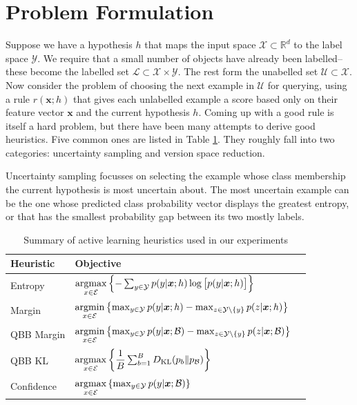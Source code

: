 \documentclass[fleqn,10pt,lineno]{wlpeerj} %
\newcommand{\B}{\mathcal{B}}
\newcommand{\X}{\mathcal{X}}
\newcommand{\Y}{\mathcal{Y}}
\newcommand{\Ecal}{\mathcal{E}}
\newcommand{\Unlabelled}{\mathcal{U}}
\newcommand{\Labelled}{\mathcal{L}}
\newcommand*{\argmin}{\operatornamewithlimits{argmin}\limits}
\newcommand*{\argmax}{\operatornamewithlimits{argmax}\limits}
\begin{document}
\section*{Problem Formulation}

Suppose we have a hypothesis $h$ that maps the input space $\X \subset \mathbb{R}^d$
to the label space $\Y$. We require that a small number of objects have already
been labelled--these become the labelled set $\Labelled \subset \X \times \Y$.
The rest form the unabelled set
$\Unlabelled \subset \X$. Now consider the problem of choosing the next example
in $\Unlabelled$ for querying, using a rule
$r(\bm{x}; h)$ that gives each unlabelled example a score based only on
their feature vector $\bm{x}$ and the current hypothesis $h$. Coming up with a good
rule is itself a hard problem, but there have been many attempts to derive
good heuristics. Five common ones are listed in Table \ref{tab:heuristics}.
They roughly fall into two categories: uncertainty sampling and version space
reduction.

Uncertainty sampling focusses on selecting the example whose class membership
the current hypothesis is most uncertain about. The most uncertain example can
be the one whose predicted class probability vector displays the greatest entropy, or
that has the smallest probability gap between its two mostly labels.


\begin{table}[h]
	\caption {Summary of active learning heuristics used in our experiments} \label{tab:heuristics}
	\centering
	\begin{tabular}{lll}
		\toprule
		{Heuristic}  &  Objective  \\
		\midrule
		Entropy &
			$\argmax_{x \in \Ecal} \left\{-\sum_{y \in \Y} p(y | \bm{x}; h)
            \log \big[ p(y | \bm{x}; h) \big] \right\}$
			\\[2ex]
		Margin &
			$\argmin_{x \in \Ecal} \left\{ \max_{y \in \Y} p(y | \bm{x}; h) -
            \max_{z \in \Y \setminus \{y\}} p(z | \bm{x}; h)  \right\}$
			\\[2ex]
		QBB Margin &
			$\argmin_{x \in \Ecal} \left\{ \max_{y \in \Y} p(y | \bm{x}; \B) -
            \max_{z \in \Y \setminus \{y\}} p(z | \bm{x}; \B)  \right\}$
			\\[2ex]
		QBB KL &
			$\argmax_{x \in \Ecal} \left\{ \dfrac{1}{B}
               \sum_{b=1}^B D_{\mathrm{KL}}(p_b\|p_\B) \right\}$
			\\
        Confidence &
			$\argmax_{x \in \Ecal} \left\{ \max_{y \in \Y} p(y | \bm{x}; \B) \right\}$
			\\
		\bottomrule
	\end{tabular}
\end{table}
\end{document}
